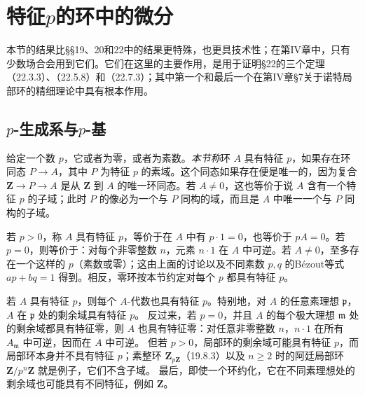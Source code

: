 \setcounter{section}{20}
\section{\texorpdfstring{特征$p$的环中的微分}{特征p的环中的微分}}
本节的结果比§§19、20和22中的结果更特殊，也更具技术性；在第IV章中，只有少数场合会用到它们。它们在这里的主要作用，是用于证明§22的三个定理（22.3.3）、（22.5.8）和（22.7.3）；其中第一个和最后一个在第IV章§7关于诺特局部环的精细理论中具有根本作用。

\subsection{\texorpdfstring{$p$-生成系与$p$-基}{p-生成系与p-基}}
给定一个数 $p$，它或者为零，或者为素数。\emph{本节称}环 $A$ 具有特征 $p$，如果存在环同态 $P\to A$，其中 $P$ 为特征 $p$ 的素域。这个同态如果存在便是唯一的，因为复合 $\mathbf Z\to P\to A$ 是从 $\mathbf Z$ 到 $A$ 的唯一环同态。若 $A\ne0$，这也等价于说 $A$ 含有一个特征 $p$ 的子域；此时 $P$ 的像必为一个与 $P$ 同构的域，而且是 $A$ 中唯一一个与 $P$ 同构的子域。

若 $p>0$，称 $A$ 具有特征 $p$，等价于在 $A$ 中有 $p\cdot1=0$，也等价于 $pA=0$。若 $p=0$，则等价于：对每个非零整数 $n$，元素 $n\cdot1$ 在 $A$ 中可逆。若 $A\ne0$，至多存在一个这样的 $p$（素数或零）；这由上面的讨论以及不同素数 $p,q$ 的Bézout等式 $ap+bq=1$ 得到。相反，零环按本节约定对每个 $p$ 都具有特征 $p$。

若 $A$ 具有特征 $p$，则每个 $A$-代数也具有特征 $p$。特别地，对 $A$ 的任意素理想 $\mathfrak p$，$A$ 在 $\mathfrak p$ 处的剩余域具有特征 $p$。
反过来，若 $p=0$，并且 $A$ 的每个极大理想 $\mathfrak m$ 处的剩余域都具有特征零，则 $A$ 也具有特征零：对任意非零整数 $n$，$n\cdot1$ 在所有 $A_{\mathfrak m}$ 中可逆，因而在 $A$ 中可逆。
但若 $p>0$，局部环的剩余域可能具有特征 $p$，而局部环本身并不具有特征 $p$；素整环 $\mathbf Z_{p\mathbf Z}$（19.8.3）以及 $n\ge2$ 时的阿廷局部环 $\mathbf Z/p^n\mathbf Z$ 就是例子，它们不含子域。
最后，即使一个环约化，它在不同素理想处的剩余域也可能具有不同特征，例如 $\mathbf Z$。

